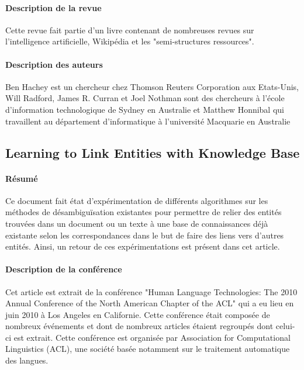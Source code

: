 \documentclass{article}
\begin{document}
\paragraph{Description de la revue}
Cette revue fait partie d'un livre contenant de nombreuses revues sur l'intelligence artificielle, Wikipédia et les "semi-structures ressources".

\paragraph{Description des auteurs}
Ben Hachey est un chercheur chez Thomson Reuters Corporation aux Etats-Unis, Will Radford, James R. Curran et Joel Nothman sont des chercheurs à l'école d'information technologique de Sydney en Australie et Matthew Honnibal qui travaillent au département d'informatique à l'université Macquarie en Australie

\subsection{Learning to Link Entities with Knowledge Base\cite{article-4}}

\paragraph{Résumé}
Ce document fait état d'expérimentation de différents algorithmes sur les  méthodes de désambiguïsation existantes pour permettre de relier des entités trouvées dans un document ou un texte à une base de connaissances déjà existante selon les correspondances dans le but de faire des liens vers d'autres entités. Ainsi, un retour de ces expérimentations est présent dans cet article.

\paragraph{Description de la conférence}
Cet article est extrait de la conférence "Human Language Technologies: The 2010 Annual Conference of the North American Chapter of the ACL" qui a eu lieu en juin 2010 à Los Angeles en Californie. Cette conférence était composée de nombreux événements et dont de nombreux articles étaient regroupés dont celui-ci est extrait. Cette conférence est organisée par Association for Computational Linguistics (ACL), une société basée notamment sur le traitement automatique des langues.
\end{document}
